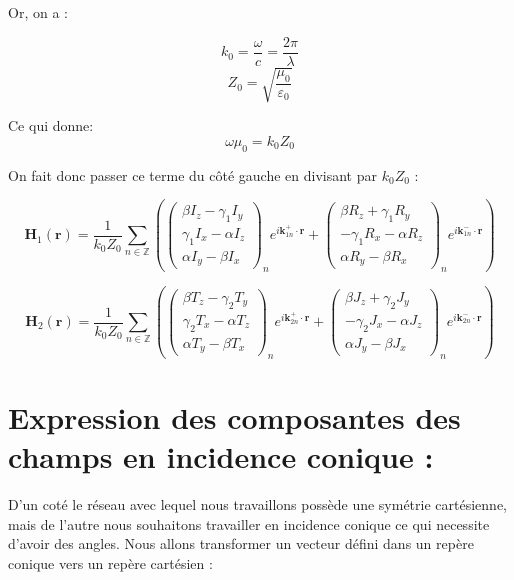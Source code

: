 \documentclass{article}
\begin{document}
Or, on a :

\[
k_0 = \frac{\omega}{c} = \frac{2\pi}{\lambda}
\]
\[
Z_0 = \sqrt{\frac{\mu_0}{\varepsilon_0}} 
\]

Ce qui donne: 
\[
\omega \mu_0 = k_0 Z_0
\]

On fait donc passer ce terme du côté gauche en divisant par \( k_0 Z_0 \) :

\[
\mathbf{H}_1(\mathbf{r}) = \frac{1}{k_0 Z_0} \sum_{n \in \mathbb{Z}} 
\left(
\begin{pmatrix}
\beta I_{z} - \gamma_1 I_{y} \\
\gamma_1 I_{x} - \alpha I_{z} \\
\alpha I_{y} - \beta I_{x}
\end{pmatrix}_n
e^{i \mathbf{k}_{1n}^{+} \cdot \mathbf{r}} +
\begin{pmatrix}
\beta R_{z} + \gamma_1 R_{y} \\
- \gamma_1 R_{x} - \alpha R_{z} \\
\alpha R_{y} - \beta R_{x}
\end{pmatrix}_n
e^{i \mathbf{k}_{1n}^{-} \cdot \mathbf{r}}
\right)
\]

\[
\mathbf{H}_2(\mathbf{r}) = \frac{1}{k_0 Z_0} \sum_{n \in \mathbb{Z}} 
\left(
\begin{pmatrix}
\beta T_{z} - \gamma_2 T_{y} \\
\gamma_2 T_{x} - \alpha T_{z} \\
\alpha T_{y} - \beta T_{x}
\end{pmatrix}_n
e^{i \mathbf{k}_{2n}^{+} \cdot \mathbf{r}} +
\begin{pmatrix}
\beta J_{z} + \gamma_2 J_{y} \\
- \gamma_2 J_{x} - \alpha J_{z} \\
\alpha J_{y} - \beta J_{x}
\end{pmatrix}_n
e^{i \mathbf{k}_{2n}^{-} \cdot \mathbf{r}}
\right)
\]

\section*{Expression des composantes des champs en incidence conique :}

D'un coté le réseau avec lequel nous travaillons possède une symétrie cartésienne, mais de l'autre nous souhaitons travailler en incidence conique ce qui necessite d'avoir des angles. Nous allons transformer un vecteur défini dans un repère conique vers un repère cartésien :
\end{document}
